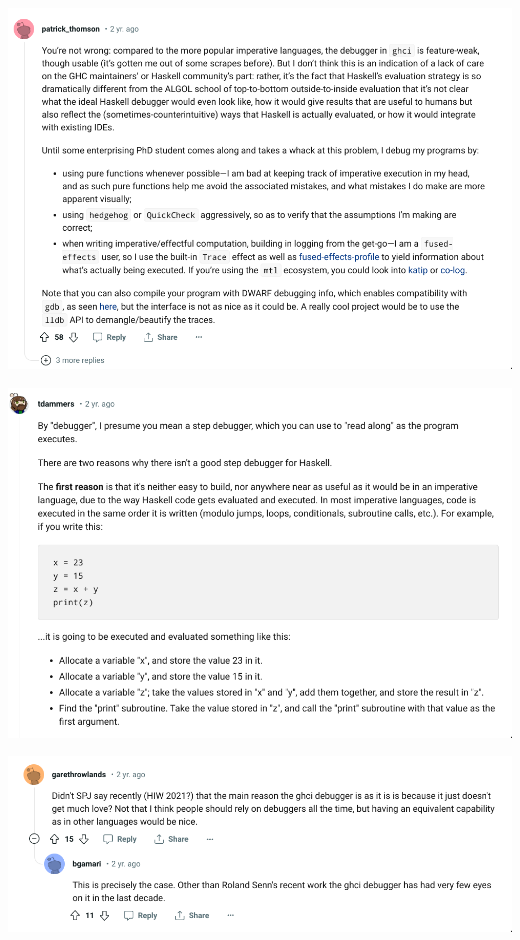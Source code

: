 \documentclass{beamer}   	%
\theoremstyle{definition}
\begin{document}
\begin{frame}
	\includegraphics[width=\linewidth]{snapshots/haskell_debugging_is_hard01.png}
\end{frame}

\begin{frame}
	\includegraphics[width=\linewidth]{snapshots/haskell_debugging_is_hard02.png}
\end{frame}

\begin{frame}
	\includegraphics[width=\linewidth]{snapshots/haskell_debugging_is_hard03.png}
\end{frame}
\end{document}
